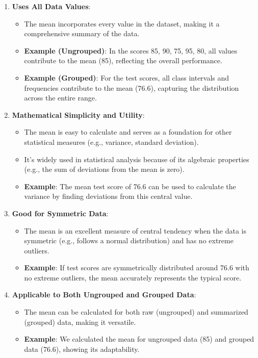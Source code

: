 \documentclass[11pt]{article}
\begin{document}
\begin{enumerate}
    \item \textbf{Uses All Data Values}:
    \begin{itemize}
        \item The mean incorporates every value in the dataset, making it a comprehensive summary of the data.
        \item \textbf{Example (Ungrouped)}: In the scores 85, 90, 75, 95, 80, all values contribute to the mean (85), reflecting the overall performance.
        \item \textbf{Example (Grouped)}: For the test scores, all class intervals and frequencies contribute to the mean (76.6), capturing the distribution across the entire range.
    \end{itemize}

    \item \textbf{Mathematical Simplicity and Utility}:
    \begin{itemize}
        \item The mean is easy to calculate and serves as a foundation for other statistical measures (e.g., variance, standard deviation).
        \item It’s widely used in statistical analysis because of its algebraic properties (e.g., the sum of deviations from the mean is zero).
        \item \textbf{Example}: The mean test score of 76.6 can be used to calculate the variance by finding deviations from this central value.
    \end{itemize}

    \item \textbf{Good for Symmetric Data}:
    \begin{itemize}
        \item The mean is an excellent measure of central tendency when the data is symmetric (e.g., follows a normal distribution) and has no extreme outliers.
        \item \textbf{Example}: If test scores are symmetrically distributed around 76.6 with no extreme outliers, the mean accurately represents the typical score.
    \end{itemize}

    \item \textbf{Applicable to Both Ungrouped and Grouped Data}:
    \begin{itemize}
        \item The mean can be calculated for both raw (ungrouped) and summarized (grouped) data, making it versatile.
        \item \textbf{Example}: We calculated the mean for ungrouped data (85) and grouped data (76.6), showing its adaptability.
    \end{itemize}
\end{enumerate}
\end{document}
